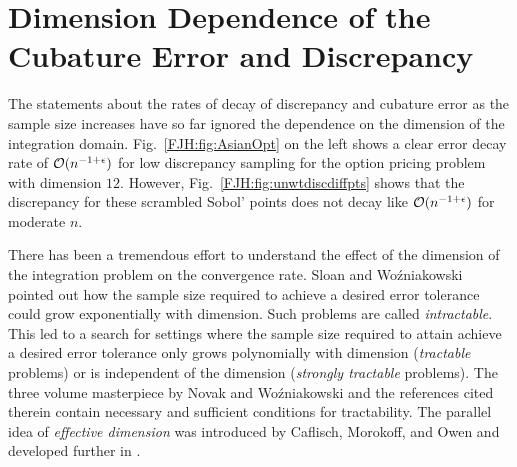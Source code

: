 \documentclass[graybox,footinfo]{svmult}
\begin{document}
\section{Dimension Dependence of the Cubature Error and Discrepancy} 
\label{FJH:sec:Tract}
The statements about the rates of decay of discrepancy and cubature error as the 
sample size increases have so far ignored the dependence on the dimension of the 
integration domain.  Fig.\ \ref{FJH:fig:AsianOpt} on the left shows a 
clear error 
decay rate of ${\mathcal{O}}(n^{-1 + \epsilon})$ for low discrepancy sampling for the option 
pricing problem with dimension $12$.  However, Fig.\ \ref{FJH:fig:unwtdiscdiffpts} shows 
that the discrepancy for these scrambled Sobol' points does not decay like ${\mathcal{O}}(n^{-1 
+ \epsilon})$ for moderate $n$.  

There has been a tremendous effort to 
understand the effect of the dimension of the integration problem on the convergence 
rate.  Sloan and Wo\'zniakowski \cite{SloWoz97} pointed out how
the sample size required to achieve a desired error tolerance could grow exponentially 
with 
dimension.  Such problems are called \emph{intractable}.  This led to a search for 
settings where the sample size required to attain achieve a desired error tolerance only 
grows polynomially with dimension (\emph{tractable} problems) or is independent of the 
dimension (\emph{strongly tractable} problems). The three volume masterpiece by Novak 
and Wo\'zniakowski \cite{NovWoz08a,NovWoz10a,NovWoz12a} and the references cited 
therein contain necessary and sufficient conditions for tractability.  The parallel idea
of \emph{effective dimension} was introduced by Caflisch, Morokoff, 
and Owen \cite{CafMorOwe97} and developed further in \cite{LiuOwe04a}.
\end{document}
